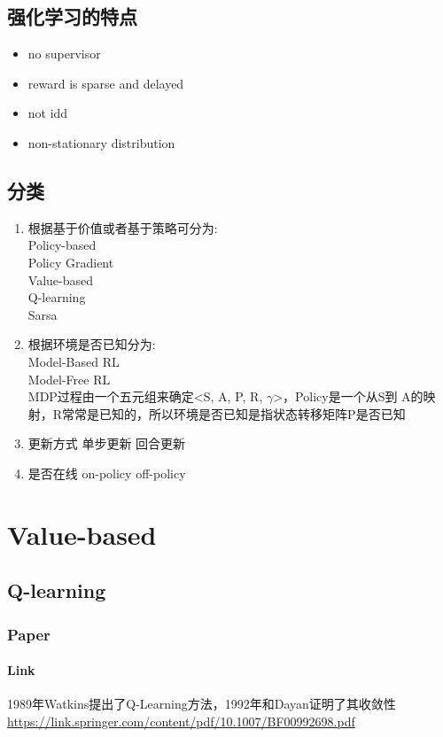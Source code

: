 \documentclass{book}
\begin{document}
\section{强化学习的特点}
\begin{itemize}
	\item no supervisor
	\item reward is sparse and delayed
	\item not idd
	\item non-stationary distribution
\end{itemize}
\section{分类}
\begin{enumerate}
\item 根据基于价值或者基于策略可分为:\\
Policy-based\\
Policy Gradient\\

Value-based\\
Q-learning\\
Sarsa\\

\item 根据环境是否已知分为:\\
Model-Based RL\\
Model-Free RL\\
MDP过程由一个五元组来确定<S, A, P, R, $\gamma$>，Policy是一个从S到
A的映射，R常常是已知的，所以环境是否已知是指状态转移矩阵P是否已知

\item 更新方式
单步更新
回合更新

\item 是否在线
on-policy
off-policy
\end{enumerate}
\chapter{Value-based}
\section{Q-learning}
\subsection{Paper}
\subsubsection{Link}
\noindent 1989年Watkins提出了Q-Learning方法，1992年和Dayan证明了其收敛性\\
\url{https://link.springer.com/content/pdf/10.1007/BF00992698.pdf}
\end{document}
